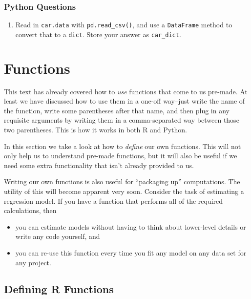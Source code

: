 \documentclass[
  12pt,
  krantz2]{krantz}
\providecommand{\tightlist}{%
  \setlength{\itemsep}{0pt}\setlength{\parskip}{0pt}}
\begin{document}
\hypertarget{python-questions-3}{%
\subsection{Python Questions}\label{python-questions-3}}

\begin{enumerate}
\def\labelenumi{\arabic{enumi}.}
\tightlist
\item
  Read in \texttt{car.data} with \texttt{pd.read\_csv()}, and use a \texttt{DataFrame} method to convert that to a \texttt{dict}. Store your answer as \texttt{car\_dict}.
\end{enumerate}

\hypertarget{functions}{%
\chapter{Functions}\label{functions}}

This text has already covered how to \emph{use} functions that come to us pre-made. At least we have discussed how to use them in a one-off way--just write the name of the function, write some parentheses after that name, and then plug in any requisite arguments by writing them in a comma-separated way between those two parentheses. This is how it works in both R and Python.

In this section we take a look at how to \emph{define} our own functions. This will not only help us to understand pre-made functions, but it will also be useful if we need some extra functionality that isn't already provided to us.

Writing our own functions is also useful for ``packaging up'' computations. The utility of this will become apparent very soon. Consider the task of estimating a regression model. If you have a function that performs all of the required calculations, then

\begin{itemize}
\tightlist
\item
  you can estimate models without having to think about lower-level details or write any code yourself, and
\item
  you can re-use this function every time you fit any model on any data set for any project.
\end{itemize}

\hypertarget{defining-r-functions}{%
\section{Defining R Functions}\label{defining-r-functions}}
\end{document}
